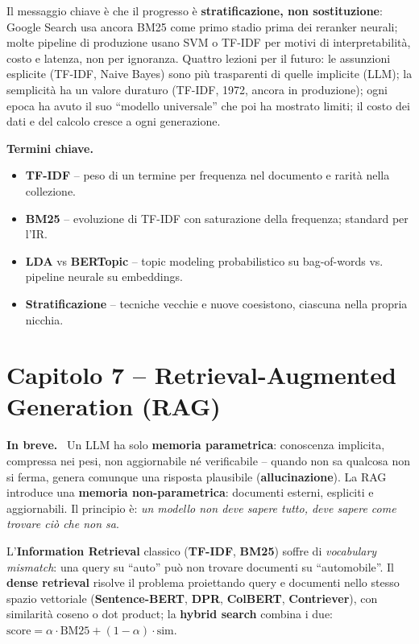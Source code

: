 \documentclass[11pt,a4paper]{article}
\newcommand{\spiega}{\medskip\noindent\textbf{\textcolor{blue!45!black}{In breve.}}\ }
\newcommand{\termini}{\medskip\noindent\textbf{\textcolor{blue!45!black}{Termini chiave.}}}
\begin{document}
Il messaggio chiave \`e che il progresso \`e \textbf{stratificazione, non sostituzione}: Google Search usa ancora BM25 come primo stadio prima dei reranker neurali; molte pipeline di produzione usano SVM o TF-IDF per motivi di interpretabilit\`a, costo e latenza, non per ignoranza. Quattro lezioni per il futuro: le assunzioni esplicite (TF-IDF, Naive Bayes) sono pi\`u trasparenti di quelle implicite (LLM); la semplicit\`a ha un valore duraturo (TF-IDF, 1972, ancora in produzione); ogni epoca ha avuto il suo ``modello universale'' che poi ha mostrato limiti; il costo dei dati e del calcolo cresce a ogni generazione.

\termini
\begin{itemize}
\item \textbf{TF-IDF} -- peso di un termine per frequenza nel documento e rarit\`a nella collezione.
\item \textbf{BM25} -- evoluzione di TF-IDF con saturazione della frequenza; standard per l'IR.
\item \textbf{LDA} vs \textbf{BERTopic} -- topic modeling probabilistico su bag-of-words vs. pipeline neurale su embeddings.
\item \textbf{Stratificazione} -- tecniche vecchie e nuove coesistono, ciascuna nella propria nicchia.
\end{itemize}

\section*{Capitolo 7 -- Retrieval-Augmented Generation (RAG)}

\spiega
Un LLM ha solo \textbf{memoria parametrica}: conoscenza implicita, compressa nei pesi, non aggiornabile n\'e verificabile -- quando non sa qualcosa non si ferma, genera comunque una risposta plausibile (\textbf{allucinazione}). La RAG introduce una \textbf{memoria non-parametrica}: documenti esterni, espliciti e aggiornabili. Il principio \`e: \emph{un modello non deve sapere tutto, deve sapere come trovare ci\`o che non sa}.

L'\textbf{Information Retrieval} classico (\textbf{TF-IDF}, \textbf{BM25}) soffre di \emph{vocabulary mismatch}: una query su ``auto'' pu\`o non trovare documenti su ``automobile''. Il \textbf{dense retrieval} risolve il problema proiettando query e documenti nello stesso spazio vettoriale (\textbf{Sentence-BERT}, \textbf{DPR}, \textbf{ColBERT}, \textbf{Contriever}), con similarit\`a coseno o dot product; la \textbf{hybrid search} combina i due: $\text{score}=\alpha\cdot\text{BM25}+(1-\alpha)\cdot\text{sim}$.
\end{document}
